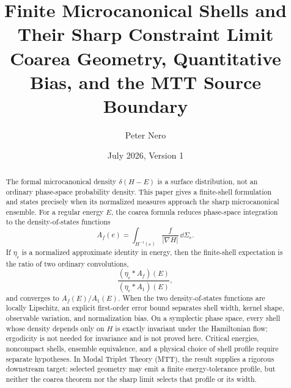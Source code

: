 \documentclass[11pt]{article}
\title{Finite Microcanonical Shells and Their Sharp Constraint Limit\\
\large Coarea Geometry, Quantitative Bias, and the MTT Source Boundary}
\author{Peter Nero}
\date{July 2026, Version 1}
\begin{document}
\maketitle

\begin{abstract}
The formal microcanonical density
\(\delta(H-E)\) is a surface distribution, not an ordinary phase-space
probability density. This paper gives a finite-shell formulation and states
precisely when its normalized measures approach the sharp microcanonical
ensemble. For a regular energy \(E\), the coarea formula reduces phase-space
integration to the density-of-states functions
\[
A_f(e)=\int_{H^{-1}(e)}
\frac{f}{|\nabla H|}\,\dd\Sigma_e.
\]
If \(\eta_\epsilon\) is a normalized approximate identity in energy, then the
finite-shell expectation is the ratio of two ordinary convolutions,
\[
\frac{(\eta_\epsilon*A_f)(E)}
{(\eta_\epsilon*A_1)(E)},
\]
and converges to \(A_f(E)/A_1(E)\). When the two density-of-states functions
are locally Lipschitz, an explicit first-order error bound separates shell
width, kernel shape, observable variation, and normalization bias. On a
symplectic phase space, every shell whose density depends only on \(H\) is
exactly invariant under the Hamiltonian flow; ergodicity is not needed for
invariance and is not proved here. Critical energies, noncompact shells,
ensemble equivalence, and a physical choice of shell profile require separate
hypotheses. In Modal Triplet Theory (MTT), the result supplies a rigorous
downstream target: selected geometry may emit a finite energy-tolerance
profile, but neither the coarea theorem nor the sharp limit selects that
profile or its width.
\end{abstract}
\end{document}
